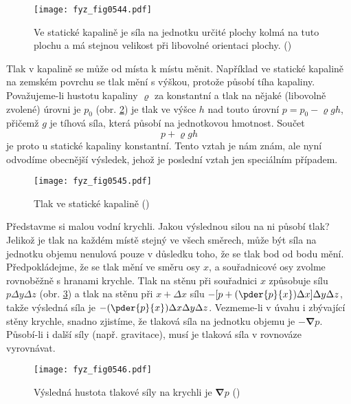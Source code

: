     \begin{figure}[ht!] %
      \centering
      \texttt{[image: fyz\_fig0544.pdf]}
      \caption{Ve statické kapalině je síla na jednotku určité plochy kolmá na tuto plochu a má 
               stejnou velikost při libovolné orientaci plochy. 
               (\cite[s.~741]{Feynman02})}
      \label{fyz:fig0544}
    \end{figure}

    Tlak v kapalině se může od místa k místu měnit. Například ve statické kapalině na zemském 
    povrchu se tlak mění s výškou, protože působí tíha kapaliny. Považujeme-li hustotu kapaliny 
    \(\varrho\) za konstantní a tlak na nějaké (libovolně zvolené) úrovni je \(p_0\) (obr. 
    \ref{fyz:fig0545}) je tlak ve výšce \(h\) nad touto úrovní \(p=p_0 - \varrho gh\), přičemž \(g\) 
    je tíhová síla, která působí na jednotkovou hmotnost. Součet
    \begin{equation*}
      p + \varrho gh
    \end{equation*}
    je proto u statické kapaliny konstantní. Tento vztah je nám znám, ale nyní odvodíme obecnější 
    výsledek, jehož je poslední vztah jen speciálním případem.
    
    \begin{figure}[ht!] %
      \centering
      \texttt{[image: fyz\_fig0545.pdf]}
      \caption{Tlak ve statické kapalině
               (\cite[s.~741]{Feynman02})}
      \label{fyz:fig0545}
    \end{figure}
    
    Představme si malou vodní krychli. Jakou výslednou silou na ni působí tlak? Jelikož je tlak na 
    každém místě stejný ve všech směrech, může být síla na jednotku objemu nenulová pouze v 
    důsledku toho, že se tlak bod od bodu mění. Předpokládejme, že se tlak mění ve směru osy \(x\), 
    a souřadnicové osy zvolme rovnoběžně s hranami krychle. Tlak na stěnu při souřadnici \(x\) 
    způsobuje sílu \(p\Delta y\Delta z\) (obr. \ref{fyz:fig0546}) a tlak na stěnu při \(x + \Delta 
    x\) sílu \(-[p + (\pder{p}{x})\Delta x]\Delta y \Delta z\), takže výsledná síla je 
    \(-(\pder{p}{x})\Delta x\Delta y\Delta z\). Vezmeme-li v úvahu i zbývající stěny krychle, 
    snadno zjistíme, že tlaková síla na jednotku objemu je \(-\symbf{\nabla}p\). Působí-li i další 
    síly (např. gravitace), musí je tlaková síla v rovnováze vyrovnávat.

    \begin{figure}[ht!] %
      \centering
      \texttt{[image: fyz\_fig0546.pdf]}
      \caption{Výsledná hustota tlakové síly na krychli je \(\symbf{\nabla} p\)
               (\cite[s.~742]{Feynman02})}
      \label{fyz:fig0546}
    \end{figure}
    
